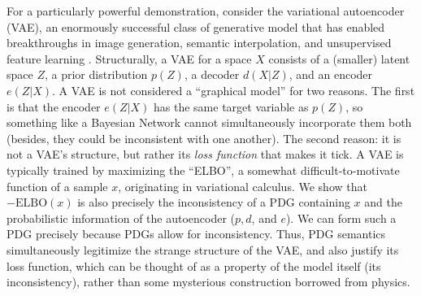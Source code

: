 \documentclass[twoside]{article}
\theoremstyle{plain}
\theoremstyle{definition}
\begin{document}
For a particularly powerful demonstration, consider the variational
autoencoder (VAE), an enormously successful class of generative model
that has enabled breakthroughs in image generation, semantic
interpolation, and unsupervised feature learning
\parencite{kingma2013autoencoding}.
Structurally, a VAE for a space $X$ consists of a (smaller) latent space $Z$, a prior distribution $p(Z)$, a decoder $d(X | Z)$, and an encoder $e(Z| X)$.
A VAE is not considered a ``graphical model'' for two reasons.
The first is that the encoder $e(Z|X)$ has the same target variable as $p(Z)$, so
something like a Bayesian Network
cannot simultaneously incorporate them both
	(besides, they could be inconsistent with one another).
The second reason: it is not a VAE's structure, but rather its \emph{loss function} that makes
it tick.
A VAE is typically trained by
maximizing the ``ELBO'',
    a somewhat difficult-to-motivate function of a sample $x$, originating in variational calculus.
    We show that $-\mathrm{ELBO}(x)$ is also
    precisely the inconsistency of a PDG containing
	$x$
	and the probabilistic
    information of the autoencoder ($p, d$, and $e$).
We can form such a PDG precisely because PDGs allow for inconsistency.
Thus, PDG semantics simultaneously legitimize the strange structure of
the VAE, and also justify its loss function, which can be thought of
as a property of the model itself (its inconsistency), rather than
some mysterious construction borrowed from physics.



\end{document}
